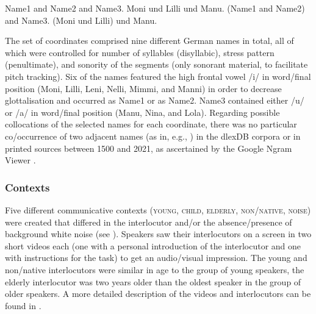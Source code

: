 \documentclass[output=paper]{langscibook}
\begin{document}
\ea Name1 and Name2 and Name3. \label{nobrack} \hfill Moni und Lilli und Manu.
\ex (Name1 and Name2) and Name3. \label{brack} \hfill (Moni und Lilli) und Manu.
\z

The set of coordinates comprised nine different German names in total, all of which were controlled for number of syllables (disyllabic), stress pattern (penultimate), and sonority of the segments (only sonorant material, to facilitate pitch tracking). Six of the names featured the high frontal vowel /i/ in word\-/final position (Moni, Lilli, Leni, Nelli, Mimmi, and Manni) in order to decrease glottalisation and occurred as Name1 or as Name2. Name3 contained either /u/ or /a/ in word\-/final position (Manu, Nina, and Lola). Regarding possible collocations of the selected names for each coordinate, there was no particular co\-/occurrence of two adjacent names (as in, e.g., ) in the dlexDB corpora \citep{heister2011dlexdb} or in printed sources between 1500 and 2021, as ascertained by the Google Ngram Viewer \citep{lin2012syntactic}. 

\subsubsection{Contexts}\label{2.2.2}
\begin{sloppypar}
Five different communicative contexts (\textsc{young}, \textsc{child}, \textsc{elderly}, \textsc{non\-/native}, \textsc{noise}) were created that differed in the interlocutor and/or the absence\fshyp presence of background white noise (see ). Speakers saw their interlocutors on a screen in two short videos each (one with a personal introduction of the interlocutor and one with instructions for the task) to get an audio\-/visual impression. The young and non\-/native interlocutors were similar in age to the group of young speakers, the elderly interlocutor was two years older than the oldest speaker in the group of older speakers. A more detailed description of the videos and interlocutors can be found in \citet{huttenlauchetal2021}.
\end{sloppypar}
\end{document}
